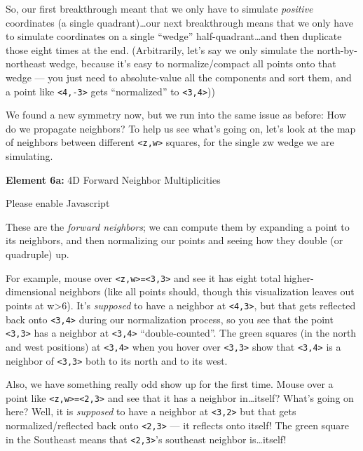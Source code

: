 \documentclass[]{article}
\begin{document}
So, our first breakthrough meant that we only have to simulate \emph{positive}
coordinates (a single quadrant)\ldots our next breakthrough means that we only
have to simulate coordinates on a single ``wedge'' half-quadrant\ldots and then
duplicate those eight times at the end. (Arbitrarily, let's say we only simulate
the north-by-northeast wedge, because it's easy to normalize/compact all points
onto that wedge --- you just need to absolute-value all the components and sort
them, and a point like \texttt{\textless{}4,-3\textgreater{}} gets
``normalized'' to \texttt{\textless{}3,4\textgreater{}}))

We found a new symmetry now, but we run into the same issue as before: How do we
propagate neighbors? To help us see what's going on, let's look at the map of
neighbors between different \texttt{\textless{}z,w\textgreater{}} squares, for
the single zw wedge we are simulating.

\leavevmode\hypertarget{golSyms4DForward}{}%
\textbf{Element 6a:} 4D Forward Neighbor Multiplicities

\leavevmode\hypertarget{golSyms4DForwardCont}{}%
Please enable Javascript

These are the \emph{forward neighbors}; we can compute them by expanding a point
to its neighbors, and then normalizing our points and seeing how they double (or
quadruple) up.

For example, mouse over
\texttt{\textless{}z,w\textgreater{}=\textless{}3,3\textgreater{}} and see it
has eight total higher-dimensional neighbors (like all points should, though
this visualization leaves out points at w\textgreater6). It's \emph{supposed} to
have a neighbor at \texttt{\textless{}4,3\textgreater{}}, but that gets
reflected back onto \texttt{\textless{}3,4\textgreater{}} during our
normalization process, so you see that the point
\texttt{\textless{}3,3\textgreater{}} has a neighbor at
\texttt{\textless{}3,4\textgreater{}} ``double-counted''. The green squares (in
the north and west positions) at \texttt{\textless{}3,4\textgreater{}} when you
hover over \texttt{\textless{}3,3\textgreater{}} show that
\texttt{\textless{}3,4\textgreater{}} is a neighbor of
\texttt{\textless{}3,3\textgreater{}} both to its north and to its west.

Also, we have something really odd show up for the first time. Mouse over a
point like \texttt{\textless{}z,w\textgreater{}=\textless{}2,3\textgreater{}}
and see that it has a neighbor in\ldots itself? What's going on here? Well, it
is \emph{supposed} to have a neighbor at \texttt{\textless{}3,2\textgreater{}}
but that gets normalized/reflected back onto
\texttt{\textless{}2,3\textgreater{}} --- it reflects onto itself! The green
square in the Southeast means that \texttt{\textless{}2,3\textgreater{}}'s
southeast neighbor is\ldots itself!
\end{document}
